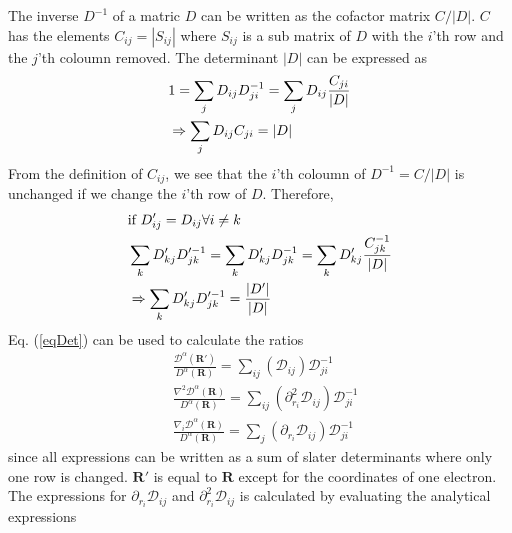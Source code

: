 \documentclass[a4paper,10pt,twocolumn]{article} %
\newcommand{\ts}[1]{\textbf{#1}}
\begin{document}
The inverse $D^{-1}$ of a matric $D$ can be written as the cofactor matrix $C/|D|$. $C$ has the elements $C_{ij}=|S_{ij}|$ where $S_{ij}$ is a sub matrix of $D$ with the $i$'th row and the 
$j$'th coloumn removed. The determinant $|D|$ can be expressed as 
\begin{align}
	&1=\sum_j D_{ij}D^{-1}_{ji}=\sum_jD_{ij}\frac{C_{ji}}{|D|}\notag\\
	&\Rightarrow \sum_jD_{ij}C_{ji}=|D|
\end{align}
From the definition of $C_{ij}$, we see that the $i$'th coloumn of $D^{-1}=C/|D|$ is unchanged if we change the $i$'th row of $D$.
Therefore,
\begin{align}
	&\text{if } D'_{ij}=D_{ij} \forall i\neq k\notag\\
	&\sum_k D'_{kj} D'^{-1}_{jk} = \sum_k D'_{kj} D^{-1}_{jk} = \sum_k D'_{kj} \frac{C^{-1}_{jk}}{|D|}\notag\\ 
	&\Rightarrow \sum_k D'_{kj} D'^{-1}_{jk} = \frac{|D'|}{|D|}\label{eqDet}
\end{align}
%
Eq. (\ref{eqDet}) can be used to calculate the ratios
\begin{align}
	&\frac{\mathcal D^\alpha(\ts R')}{D^\alpha(\ts R)}=\sum_{ij} (\mathcal D_{ij})\mathcal D^{-1}_{ji}\\
	&\frac{\nabla^2\mathcal D^\alpha(\ts R)}{D^\alpha(\ts R)}=\sum_{ij} (\partial^2_{r_i}\mathcal D_{ij})\mathcal D^{-1}_{ji}\\
	&\frac{\nabla_i\mathcal D^\alpha(\ts R)}{D^\alpha(\ts R)}=\sum_{j} (\partial_{r_i}\mathcal D_{ij})\mathcal D^{-1}_{ji}
\end{align}
since all expressions can be written as a sum of slater determinants where only one row is changed. 
$\ts R'$ is equal to $\ts R$ except for the coordinates of one electron.
The expressions for $\partial_{r_i}\mathcal D_{ij}$ and
$\partial^2_{r_i}\mathcal D_{ij}$ is calculated by evaluating the analytical expressions 
\end{document}
